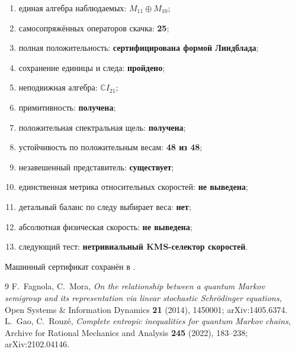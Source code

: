 \begin{protocol}
\begin{enumerate}
 \item единая алгебра наблюдаемых: \textbf{$M_{11}\oplus M_{10}$};
 \item самосопряжённых операторов скачка: \textbf{25};
 \item полная положительность: \textbf{сертифицирована формой Линдблада};
 \item сохранение единицы и следа: \textbf{пройдено};
 \item неподвижная алгебра: \textbf{$\mathbb CI_{21}$};
 \item примитивность: \textbf{получена};
 \item положительная спектральная щель: \textbf{получена};
 \item устойчивость по положительным весам: \textbf{48 из 48};
 \item незавешенный представитель: \textbf{существует};
 \item единственная метрика относительных скоростей: \textbf{не выведена};
 \item детальный баланс по следу выбирает веса: \textbf{нет};
 \item абсолютная физическая скорость: \textbf{не выведена};
 \item следующий тест: \textbf{нетривиальный KMS-селектор скоростей}.
\end{enumerate}
\end{protocol}

Машинный сертификат сохранён в
.

\begin{thebibliography}{9}
F.~Fagnola, C.~Mora,
\emph{On the relationship between a quantum Markov semigroup and its
representation via linear stochastic Schr\"odinger equations},
Open Systems \& Information Dynamics \textbf{21} (2014), 1450001;
arXiv:1405.6374.
L.~Gao, C.~Rouz\'e,
\emph{Complete entropic inequalities for quantum Markov chains},
Archive for Rational Mechanics and Analysis \textbf{245} (2022),
183--238; arXiv:2102.04146.
\end{thebibliography}